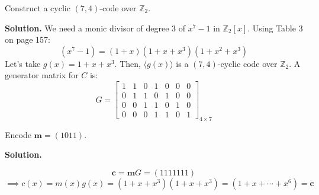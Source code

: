 \begin{Example}{}{}
    Construct a cyclic $ (7,4) $-code over $ \mathbb{Z}_2 $.

    \textbf{Solution.} We need a monic divisor
    of degree $ 3 $ of $ x^7-1 $ in $ \mathbb{Z}_2[x] $. Using
    Table 3 on page 157:
    \[ (x^7-1)=(1+x)(1+x+x^3)(1+x^2+x^3) \]
    Let's take $ g(x)=1+x+x^3 $. Then, $ \langle g(x)\rangle $ is a
    $ (7,4) $-cyclic code over $ \mathbb{Z}_2 $. A generator matrix
    for $ C $ is:
    \[ G=
        \begin{bmatrix}
            1 & 1 & 0 & 1 & 0 & 0 & 0 \\
            0 & 1 & 1 & 0 & 1 & 0 & 0 \\
            0 & 0 & 1 & 1 & 0 & 1 & 0 \\
            0 & 0 & 0 & 1 & 1 & 0 & 1
        \end{bmatrix}_{4\times 7} \]

    Encode $ \symbf{m}=(1011) $.

    \textbf{Solution.}

    \[ \symbf{c}=\symbf{m}G=(1111111) \]
    \[ \implies c(x)=m(x)g(x)=(1+x+x^3)(1+x+x^3)=(1+x+\cdots+x^6)=\symbf{c} \]
\end{Example}

